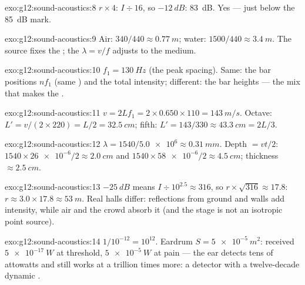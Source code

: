 \begin{solution}{exo:g12:sound-acoustics:8}
$r \times 4$: $I \div 16$, so $-\qty{12}{dB}$: \qty{83}{dB}. Yes ---
just below the \qty{85}{dB} mark.
\end{solution}

\begin{solution}{exo:g12:sound-acoustics:9}
Air: $340/440 \approx \qty{0.77}{m}$; water: $1500/440 \approx
\qty{3.4}{m}$. The source fixes the ; the 
$\lambda = v/f$ adjusts to the medium.
\end{solution}

\begin{solution}{exo:g12:sound-acoustics:10}
$f_1 = \qty{130}{Hz}$ (the peak spacing). Same: the bar positions
$nf_1$ (same ) and the total intensity; different: the bar
heights --- the mix that makes the .
\end{solution}

\begin{solution}{exo:g12:sound-acoustics:11}
$v = 2Lf_1 = 2 \times 0.650 \times 110 = \qty{143}{m/s}$. Octave:
$L' = v/(2 \times 220) = L/2 = \qty{32.5}{cm}$; fifth:
$L' = 143/330 \approx \qty{43.3}{cm} = 2L/3$.
\end{solution}

\begin{solution}{exo:g12:sound-acoustics:12}
$\lambda = 1540/\num{5.0e6} \approx \qty{0.31}{mm}$. Depth $= vt/2$:
$1540 \times \num{26e-6}/2 \approx \qty{2.0}{cm}$ and
$1540 \times \num{58e-6}/2 \approx \qty{4.5}{cm}$; thickness
$\approx \qty{2.5}{cm}$.
\end{solution}

\begin{solution}{exo:g12:sound-acoustics:13}
$-\qty{25}{dB}$ means $I \div 10^{2.5} \approx 316$, so
$r \times \sqrt{316} \approx 17.8$: $r \approx 3.0 \times 17.8
\approx \qty{53}{m}$. Real halls differ: reflections from ground and
walls add intensity, while air and the crowd absorb it (and the
stage is not an isotropic point source).
\end{solution}

\begin{solution}{exo:g12:sound-acoustics:14}
$1/10^{-12} = 10^{12}$. Eardrum $S = \qty{5e-5}{m^2}$: received
 $\qty{5e-17}{W}$ at threshold, $\qty{5e-5}{W}$ at pain --- the
ear detects tens of attowatts and still works at a trillion times
more: a detector with a twelve-decade dynamic .
\end{solution}

